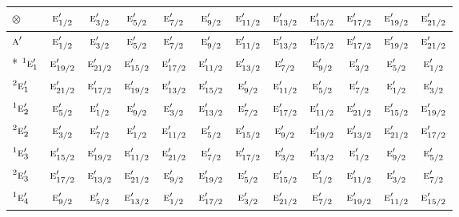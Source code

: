 \documentclass[10pt,a4paper]{article}
\numberwithin{equation}{section}
\newcommand{\irr}[1]{\text{\normalfont\scshape #1}}
\newcommand{\conjpair}[1]{{}^{#1}}
\newcommand{\irrprod}{\otimes}
\begin{document}
{\small\setlength{\tabcolsep}{3pt}\begin{longtable}{@{}lccccccccccc@{}}\toprule
$\irrprod$ & $\irr{e}_{1/2}'$ & $\irr{e}_{3/2}'$ & $\irr{e}_{5/2}'$ & $\irr{e}_{7/2}'$ & $\irr{e}_{9/2}'$ & $\irr{e}_{11/2}'$ & $\irr{e}_{13/2}'$ & $\irr{e}_{15/2}'$ & $\irr{e}_{17/2}'$ & $\irr{e}_{19/2}'$ & $\irr{e}_{21/2}'$\\\midrule\endhead
\bottomrule\endfoot\endlastfoot
$\irr{a}'$ & $\irr{e}_{1/2}'$ & $\irr{e}_{3/2}'$ & $\irr{e}_{5/2}'$ & $\irr{e}_{7/2}'$ & $\irr{e}_{9/2}'$ & $\irr{e}_{11/2}'$ & $\irr{e}_{13/2}'$ & $\irr{e}_{15/2}'$ & $\irr{e}_{17/2}'$ & $\irr{e}_{19/2}'$ & $\irr{e}_{21/2}'$\\*
$\conjpair{1}\irr{e}_{1}'$ & $\irr{e}_{19/2}'$ & $\irr{e}_{21/2}'$ & $\irr{e}_{15/2}'$ & $\irr{e}_{17/2}'$ & $\irr{e}_{11/2}'$ & $\irr{e}_{13/2}'$ & $\irr{e}_{7/2}'$ & $\irr{e}_{9/2}'$ & $\irr{e}_{3/2}'$ & $\irr{e}_{5/2}'$ & $\irr{e}_{1/2}'$\\
$\conjpair{2}\irr{e}_{1}'$ & $\irr{e}_{21/2}'$ & $\irr{e}_{17/2}'$ & $\irr{e}_{19/2}'$ & $\irr{e}_{13/2}'$ & $\irr{e}_{15/2}'$ & $\irr{e}_{9/2}'$ & $\irr{e}_{11/2}'$ & $\irr{e}_{5/2}'$ & $\irr{e}_{7/2}'$ & $\irr{e}_{1/2}'$ & $\irr{e}_{3/2}'$\\
$\conjpair{1}\irr{e}_{2}'$ & $\irr{e}_{5/2}'$ & $\irr{e}_{1/2}'$ & $\irr{e}_{9/2}'$ & $\irr{e}_{3/2}'$ & $\irr{e}_{13/2}'$ & $\irr{e}_{7/2}'$ & $\irr{e}_{17/2}'$ & $\irr{e}_{11/2}'$ & $\irr{e}_{21/2}'$ & $\irr{e}_{15/2}'$ & $\irr{e}_{19/2}'$\\
$\conjpair{2}\irr{e}_{2}'$ & $\irr{e}_{3/2}'$ & $\irr{e}_{7/2}'$ & $\irr{e}_{1/2}'$ & $\irr{e}_{11/2}'$ & $\irr{e}_{5/2}'$ & $\irr{e}_{15/2}'$ & $\irr{e}_{9/2}'$ & $\irr{e}_{19/2}'$ & $\irr{e}_{13/2}'$ & $\irr{e}_{21/2}'$ & $\irr{e}_{17/2}'$\\
$\conjpair{1}\irr{e}_{3}'$ & $\irr{e}_{15/2}'$ & $\irr{e}_{19/2}'$ & $\irr{e}_{11/2}'$ & $\irr{e}_{21/2}'$ & $\irr{e}_{7/2}'$ & $\irr{e}_{17/2}'$ & $\irr{e}_{3/2}'$ & $\irr{e}_{13/2}'$ & $\irr{e}_{1/2}'$ & $\irr{e}_{9/2}'$ & $\irr{e}_{5/2}'$\\
$\conjpair{2}\irr{e}_{3}'$ & $\irr{e}_{17/2}'$ & $\irr{e}_{13/2}'$ & $\irr{e}_{21/2}'$ & $\irr{e}_{9/2}'$ & $\irr{e}_{19/2}'$ & $\irr{e}_{5/2}'$ & $\irr{e}_{15/2}'$ & $\irr{e}_{1/2}'$ & $\irr{e}_{11/2}'$ & $\irr{e}_{3/2}'$ & $\irr{e}_{7/2}'$\\
$\conjpair{1}\irr{e}_{4}'$ & $\irr{e}_{9/2}'$ & $\irr{e}_{5/2}'$ & $\irr{e}_{13/2}'$ & $\irr{e}_{1/2}'$ & $\irr{e}_{17/2}'$ & $\irr{e}_{3/2}'$ & $\irr{e}_{21/2}'$ & $\irr{e}_{7/2}'$ & $\irr{e}_{19/2}'$ & $\irr{e}_{11/2}'$ & $\irr{e}_{15/2}'$\\

\end{longtable}}
\end{document}
